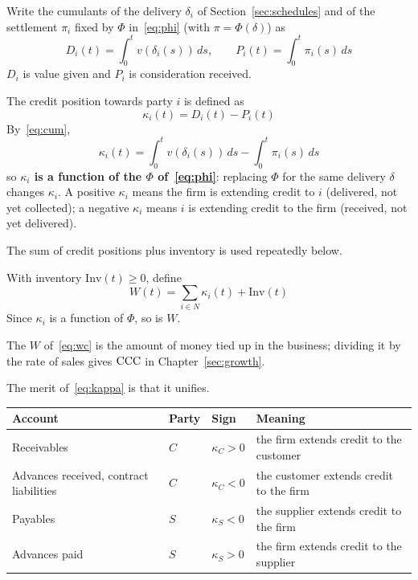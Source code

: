 Write the cumulants of the delivery $\delta_i$ of Section~\ref{sec:schedules} and of the
settlement $\pi_i$ fixed by $\Phi$ in~\eqref{eq:phi} (with $\pi=\Phi(\delta)$) as
\begin{equation}
D_i(t) = \int_0^t v(\delta_i(s))\,ds, \qquad
P_i(t) = \int_0^t \pi_i(s)\,ds
\label{eq:cum}
\end{equation}
$D_i$ is value given and $P_i$ is consideration received.

\begin{definition}
The credit position towards party $i$ is defined as
\begin{equation}
\kappa_i(t) = D_i(t) - P_i(t)
\label{eq:kappa}
\end{equation}
By~\eqref{eq:cum},
\[
\kappa_i(t) = \int_0^t v(\delta_i(s))\,ds - \int_0^t \pi_i(s)\,ds
\]
so \textbf{$\kappa_i$ is a function of the $\Phi$ of~\eqref{eq:phi}}: replacing $\Phi$ for
the same delivery $\delta$ changes $\kappa_i$. A positive $\kappa_i$ means the firm is
extending credit to $i$ (delivered, not yet collected); a negative $\kappa_i$ means $i$ is
extending credit to the firm (received, not yet delivered).
\end{definition}

The sum of credit positions plus inventory is used repeatedly below.

\begin{definition}
\label{def:wc}
With inventory $\mathrm{Inv}(t)\geq 0$, define
\begin{equation}
W(t) = \sum_{i\in N}\kappa_i(t) + \mathrm{Inv}(t)
\label{eq:wc}
\end{equation}
Since $\kappa_i$ is a function of $\Phi$, so is $W$.
\end{definition}

The $W$ of~\eqref{eq:wc} is the amount of money tied up in the business; dividing it by the
rate of sales gives $\mathrm{CCC}$ in Chapter~\ref{sec:growth}.

The merit of~\eqref{eq:kappa} is that it unifies.

\begin{center}
\begin{tabularx}{\textwidth}{@{}P{0.28\textwidth}llX@{}}
\toprule
Account & Party & Sign & Meaning \\
\midrule
Receivables & $C$ & $\kappa_C>0$ & the firm extends credit to the customer \\
Advances received, contract liabilities & $C$ & $\kappa_C<0$ & the customer extends credit to the firm \\
Payables & $S$ & $\kappa_S<0$ & the supplier extends credit to the firm \\
Advances paid & $S$ & $\kappa_S>0$ & the firm extends credit to the supplier \\
\bottomrule
\end{tabularx}
\label{tab:kappa-accounts}
\end{center}

